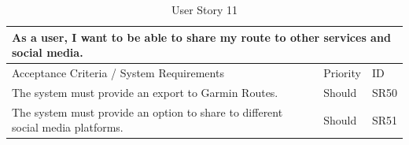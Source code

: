 \begin{table}[!htb]
  \caption{User Story 11}
  \label{tab:user-story-10}
  \begin{tabular}{ p{11cm} p{1cm}  p{1cm} }
  \hline
  \multicolumn{3}{p{13cm}}{As a user, I want to be able to share my route to other services and social media.}\\ 
  \hline
  Acceptance Criteria / System Requirements & Priority & ID\\
  \hline
  The system must provide an export to Garmin Routes. & Should & SR50\\
  The system must provide an option to share to different social media platforms. & Should & SR51\\
  \hline
  \end{tabular}
\end{table}